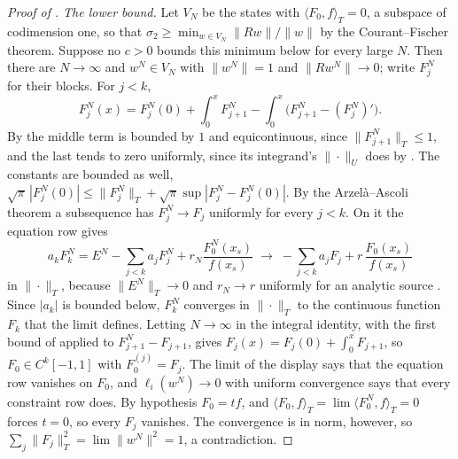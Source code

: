 \begin{proof}[Proof of ]
\emph{The lower bound.} Let $V_N$ be the states with $\langle F_0,f\rangle_T=0$, a subspace of codimension one, so that $\sigma_2\ge\min_{w\in V_N}\|Rw\|/\|w\|$ by the Courant--Fischer theorem. Suppose no $c>0$ bounds this minimum below for every large $N$. Then there are $N\to\infty$ and $w^N\in V_N$ with $\|w^N\|=1$ and $\|Rw^N\|\to0$; write $F_j^N$ for their blocks. For $j<k$,
\begin{equation*}
    F_j^N(x)=F_j^N(0)+\int_0^xF_{j+1}^N-\int_0^x\bigl(F_{j+1}^N-(F_j^N)'\bigr).
\end{equation*}
By  the middle term is bounded by $1$ and equicontinuous, since $\|F_{j+1}^N\|_T\le1$, and the last tends to zero uniformly, since its integrand's $\|\cdot\|_U$ does by . The constants are bounded as well, $\sqrt\pi\,|F_j^N(0)|\le\|F_j^N\|_T+\sqrt\pi\sup|F_j^N-F_j^N(0)|$. By the Arzelà--Ascoli theorem a subsequence has $F_j^N\to F_j$ uniformly for every $j<k$. On it the equation row gives
\begin{equation*}
    a_kF_k^N=E^N-\sum_{j<k}a_jF_j^N+r_N\frac{F_0^N(x_s)}{f(x_s)}\;\longrightarrow\;-\sum_{j<k}a_jF_j+r\,\frac{F_0(x_s)}{f(x_s)}
\end{equation*}
in $\|\cdot\|_T$, because $\|E^N\|_T\to0$ and $r_N\to r$ uniformly for an analytic source \cite[Ch.~8]{trefethen2013approximation}. Since $|a_k|$ is bounded below, $F_k^N$ converges in $\|\cdot\|_T$ to the continuous function $F_k$ that the limit defines. Letting $N\to\infty$ in the integral identity, with the first bound of  applied to $F_{j+1}^N-F_{j+1}$, gives $F_j(x)=F_j(0)+\int_0^xF_{j+1}$, so $F_0\in C^k[-1,1]$ with $F_0^{(j)}=F_j$. The limit of the display says that the equation row vanishes on $F_0$, and $\ell_i(w^N)\to0$ with uniform convergence says that every constraint row does. By hypothesis $F_0=tf$, and $\langle F_0,f\rangle_T=\lim\langle F_0^N,f\rangle_T=0$ forces $t=0$, so every $F_j$ vanishes. The convergence is in norm, however, so $\sum_j\|F_j\|_T^2=\lim\|w^N\|^2=1$, a contradiction.


\end{proof}
